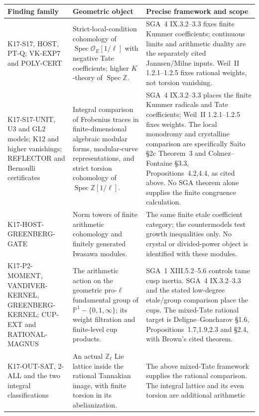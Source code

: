 \small
\begin{longtable}{>{\raggedright\arraybackslash}p{}>{\raggedright\arraybackslash}p{}>{\raggedright\arraybackslash}p{}}
\toprule
Finding family & Geometric object & Precise framework and scope\\
\midrule
\endhead
K17-S17, HOST, PT-Q; VK-EXP7 and POLY-CERT &
Strict-local-condition cohomology of
$\operatorname{Spec}\mathcal O_E[1/\ell]$ with negative Tate
coefficients; higher $K$-theory of $\operatorname{Spec}\mathbb Z$. &
SGA~4 IX.3.2--3.3 fixes finite Kummer coefficients; continuous limits
and arithmetic duality are the separately cited Jannsen/Milne inputs.
Weil~II 1.2.1--1.2.5 fixes rational weights, not torsion vanishing.\\
K17-S17-UNIT, U3 and GL2 models; K12 and higher vanishings; REFLECTOR and Bernoulli certificates &
Integral comparison of Frobenius traces in finite-dimensional algebraic modular forms, modular-curve representations, and strict torsion cohomology of $\operatorname{Spec}\mathbb Z[1/\ell]$. &
SGA~4 IX.3.2--3.3 places the finite Kummer radicals and Tate coefficients; Weil~II 1.2.1--1.2.5 fixes weights. The local monodromy and crystalline comparison are specifically Saito \S2c Theorem~3 and Colmez--Fontaine \S3.3, Propositions~4.2,4.4, as cited above. No SGA theorem alone supplies the finite congruence calculation.\\
K17-HOST-GREENBERG-GATE &
Norm towers of finite arithmetic cohomology and finitely generated
Iwasawa modules. &
The same finite etale coefficient category; the countermodels test
growth inequalities only. No crystal or divided-power object is
identified with these modules.\\
K17-P2-MOMENT, VANDIVER-KERNEL, GREENBERG-KERNEL;
CUP-EXT and RATIONAL-MAGNUS &
The arithmetic action on the geometric pro-$\ell$ fundamental group
of $\mathbb P^1-\{0,1,\infty\}$; its weight filtration and
finite-level cup products. &
SGA~1 XIII.5.2--5.6 controls tame cusp inertia. SGA~4 IX.3.2--3.3
and the stated low-degree etale/group comparison place the cups.
The mixed-Tate rational target is Deligne--Goncharov \S1.6,
Propositions~1.7,1.9,2.3 and \S2.4, with Brown's cited theorem.\\
K17-OUT-SAT, 2-ALL and the two integral classifications &
An actual $\mathbb Z_\ell$ Lie lattice inside the rational
Tannakian image, with finite torsion in its abelianization. &
The above mixed-Tate framework supplies the rational comparison.
The integral lattice and its even torsion are additional arithmetic

\end{longtable}
